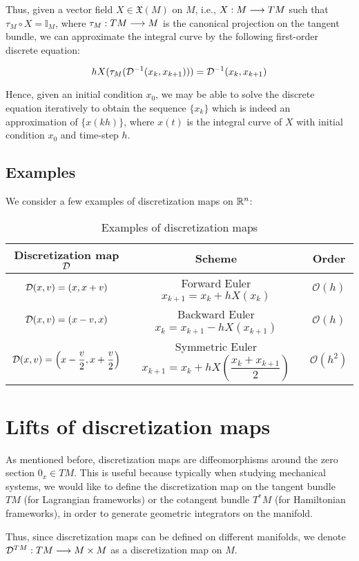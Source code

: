 Thus, given a vector field $X \in \mathfrak{X}(M)$ on $M$, i.e., $X: M \lra TM$ such that $\tau_M \circ X = \mathbb{I}_M$, where $\tau_M: TM \lra M$ is the canonical projection on the tangent bundle, we can approximate the integral curve by the following first-order discrete equation:

\[
  h X(\tau_M(\D^{-1}(x_k, x_{k+1}))) = \D^{-1}(x_k, x_{k+1})
\]

Hence, given an initial condition $x_0$, we may be able to solve the discrete equation iteratively to obtain the sequence $\{x_k\}$ which is indeed an approximation of $\{x(kh)\}$, where $x(t)$ is the integral curve of $X$ with initial condition $x_0$ and time-step $h$.

\subsection{Examples}
We consider a few examples of discretization maps on $\R[n]$:

\begin{table}[h]
\centering
\begin{tabular}{|c|c|c|}
\hline
 Discretization map $\D$ & Scheme & Order \\
\hline
 $\D(x,v) = (x, x + v)$ & Forward Euler $x_{k+1} = x_k + hX(x_k)$ & $\mathcal{O}(h)$ \\
 $\D(x,v) = (x - v, x)$ & Backward Euler $x_k = x_{k+1} - hX(x_{k+1})$ & $\mathcal{O}(h)$\\
 $\D(x, v) = \left(x - \dfrac{v}{2}, x + \dfrac{v}{2} \right)$ & Symmetric Euler $x_{k+1} = x_k + hX\left( \dfrac{x_k + x_{k+1}}{2}\right)$ & $\mathcal{O}(h^2)$\\
\hline
\end{tabular}
\caption{Examples of discretization maps}
\end{table}


\section{Lifts of discretization maps}

As mentioned before, discretization maps are diffeomorphisms around the zero section $0_x \in TM$. 
This is useful because typically when studying mechanical systems, we would like to define the discretization map on the tangent bundle $TM$ (for Lagrangian frameworks) or the cotangent bundle $T^*M$ (for Hamiltonian frameworks), in order to generate geometric integrators on the manifold.

Thus, since discretization maps can be defined on different manifolds, we denote $\D^{TM} : TM \lra M \times M$ as a discretization map on $M$.

